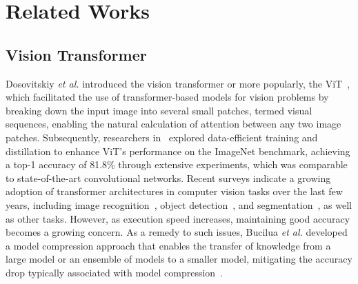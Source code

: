 \section{Related Works}
\subsection{Vision Transformer}

Dosovitskiy \textit{et al.} introduced the vision transformer or more popularly, the ViT~\cite{dosovitskiy2020image}, which facilitated the use of transformer-based models for vision problems by breaking down the input image into several small patches, termed visual sequences, enabling the natural calculation of attention between any two image patches. Subsequently, researchers in~\cite{touvron2021training} explored data-efficient training and distillation to enhance ViT's performance on the ImageNet benchmark, achieving a top-1 accuracy of 81.8\% through extensive experiments, which was comparable to state-of-the-art convolutional networks. Recent surveys indicate a growing adoption of transformer architectures in computer vision tasks over the last few years, including image recognition~\cite{han2022survey}, object detection~\cite{zhu2020deformable}, and segmentation~\cite{zheng2021rethinking}, as well as other tasks. However, as execution speed increases, maintaining good accuracy becomes a growing concern. As a remedy to such issues, Bucilua \textit{et al.} developed a model compression approach that enables the transfer of knowledge from a large model or an ensemble of models to a smaller model, mitigating the accuracy drop typically associated with model compression~\cite{bucilua2006model}.



